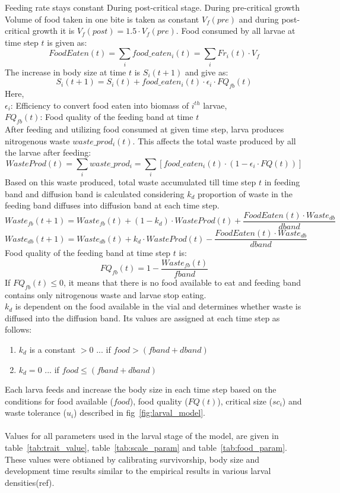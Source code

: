 Feeding rate stays constant During post-critical stage. During pre-critical growth Volume of food taken in one bite is taken as constant $V_{f}(pre)$ and during post-critical growth it is $V_{f}(post) = 1.5\cdot V_{f}(pre)$. Food consumed by all larvae at time step $t$ is given as:
\[FoodEaten(t) = \sum_{i}food\_eaten_{i}(t) = \sum_{i}Fr_{i}(t)\cdot V_{f}\]
The increase in body size at time $t$ is $S_{i}(t+1)$ and give as:
\[S_{i}(t+1) = S_{i}(t) + food\_eaten_{i}(t)\cdot \epsilon_{i}\cdot FQ_{fb}(t)\]
Here,\\
$\epsilon_{i}$: Efficiency to convert food eaten into biomass of $i^{th}$ larvae,\\
$FQ_{fb}(t)$: Food quality of the feeding band at time $t$ \\
After feeding and utilizing food consumed at given time step, larva produces nitrogenous waste $waste\_prod_{i}(t)$. This affects the total waste produced by all the larvae after feeding:
\[WasteProd(t) = \sum_{i}waste\_prod_{i} = \sum_{i}[food\_eaten_{i}(t)\cdot (1-\epsilon_{i}\cdot FQ(t))]\]
Based on this waste produced, total waste accumulated till time step $t$ in feeding band and diffusion band is calculated considering $k_{d}$ proportion of waste in the feeding band diffuses into diffusion band at each time step.
\[Waste_{fb}(t+1) = Waste_{fb}(t) + (1-k_{d})\cdot WasteProd(t) + \frac{FoodEaten(t)\cdot Waste_{db}}{dband}\]
\[Waste_{db}(t+1) = Waste_{db}(t) + k_{d}\cdot WasteProd(t) - \frac{FoodEaten(t)\cdot Waste_{db}}{dband}\]
Food quality of the feeding band at time step $t$ is:
\[FQ_{fb}(t) = 1 - \frac{Waste_{fb}(t)}{fband}\]
If $FQ_{fb}(t) \leq 0 $, it means that there is no food available to eat and feeding band contains only nitrogenous waste and larvae stop eating.\\
$k_{d}$ is dependent on the food available in the vial and determines whether waste is diffused into the diffusion band. Its values are assigned at each time step as follows:
\begin{enumerate}[i]
  \item $k_{d}$ is a constant $> 0$ ... if $food > (fband+dband)$
  \item $k_{d} = 0$ ... if $food \leq (fband+dband)$
\end{enumerate}
Each larva feeds and increase the body size in each time step based on the conditions for food available ($food$), food quality ($FQ(t)$), critical size ($sc_{i}$) and waste tolerance ($u_{i}$) described in fig~\ref{fig:larval_model}.\\ \\
Values for all parameters used in the larval stage of the model, are given in table~\ref{tab:trait_value}, table~\ref{tab:scale_param} and table~\ref{tab:food_param}. These values were obtianed by calibrating survivorship, body size and development time results similar to the empirical results in various larval densities(ref).
\newpage
